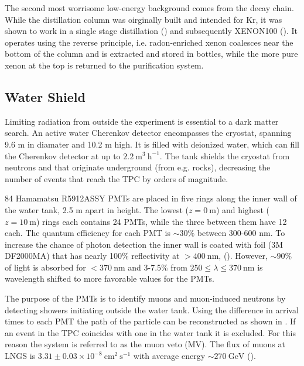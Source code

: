 The second most worrisome low-energy background comes from the  decay chain.  While the distillation column was oirginally
built and intended for Kr,
it was shown to work in a single stage distillation () and subsequently XENON100
().  It operates using the reverse principle, i.e. radon-enriched xenon coalesces near the bottom of the column and
is extracted and stored in bottles, while the more pure xenon at the top is returned to the purification system.



\subsection{Water Shield}
\label{subsec:xenon1t_water_shield}
Limiting radiation from outside the experiment is essential to a dark matter search.  An active water Cherenkov detector encompasses the
cryostat, spanning 9.6 m in diamater and 10.2 m high.  It is filled with deionized water, which can fill the Cherenkov detector at up to
$2.2\ \mathrm{m^{3}\ h^{-1}}$.  The tank shields the cryostat from neutrons and \gammarays that originate underground (from e.g. rocks),
decreasing the number of events that reach the TPC by orders of magnitude.

84 Hamamatsu R5912ASSY PMTs are placed in five rings along the inner wall of the water tank, 2.5 m apart in height.  The lowest
($z = 0\ \mathrm{m}$) and highest ($z = 10\ \mathrm{m}$) rings each contains 24 PMTs, while the three between them have 12 each.  The
quantum efficiency for each PMT is ${\sim}30\%$ between 300-600 nm.  To increase the chance of photon detection the inner wall is coated
with foil (3M DF2000MA) that has
nearly 100\% reflectivity at $> 400\ \mathrm{nm}$, ().  However, ${\sim}90\%$ of light is absorbed for
$<370\ \mathrm{nm}$ and 3-7.5\% from $250 \leq \lambda \leq 370\ \mathrm{nm}$ is wavelength shifted to more favorable values for the PMTs.

The purpose of the PMTs is to identify muons and muon-induced neutrons by detecting showers initiating
outside the water tank.  Using the difference in arrival times to each PMT the path of the particle can be reconstructed as shown in
.  If an event in the TPC coincides with one in the water tank it is excluded.  For this reason
the system is referred to as the muon veto (MV).  The flux of muons at LNGS is $3.31 \pm 0.03 \times 10^{-8}\ \mathrm{cm^2\ s^{-1}}$ with
average energy ${\sim}270\ \mathrm{GeV}$ ().

